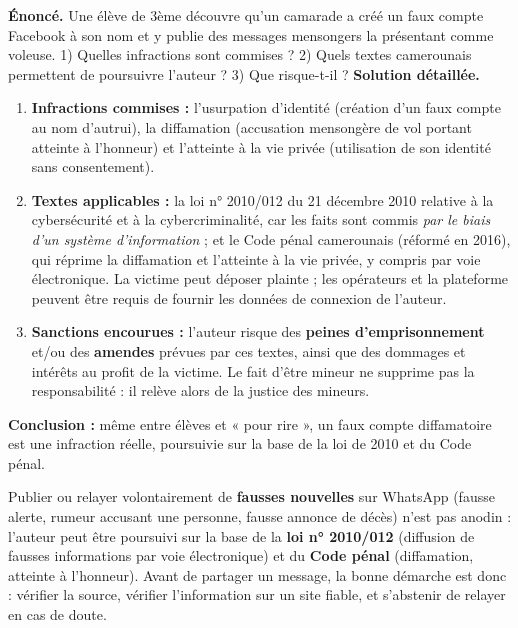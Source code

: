 \documentclass[11pt]{article}
\begin{document}
\begin{exoresolu}
\textbf{Énoncé.} Une élève de 3ème découvre qu'un camarade a créé un faux compte Facebook à son nom et y publie des messages mensongers la présentant comme voleuse. 1) Quelles infractions sont commises ? 2) Quels textes camerounais permettent de poursuivre l'auteur ? 3) Que risque-t-il ?
\tcblower
\textbf{Solution détaillée.}
\begin{enumerate}
\item \textbf{Infractions commises :} l'usurpation d'identité (création d'un faux compte au nom d'autrui), la diffamation (accusation mensongère de vol portant atteinte à l'honneur) et l'atteinte à la vie privée (utilisation de son identité sans consentement).
\item \textbf{Textes applicables :} la loi n° 2010/012 du 21 décembre 2010 relative à la cybersécurité et à la cybercriminalité, car les faits sont commis \emph{par le biais d'un système d'information} ; et le Code pénal camerounais (réformé en 2016), qui réprime la diffamation et l'atteinte à la vie privée, y compris par voie électronique. La victime peut déposer plainte ; les opérateurs et la plateforme peuvent être requis de fournir les données de connexion de l'auteur.
\item \textbf{Sanctions encourues :} l'auteur risque des \textbf{peines d'emprisonnement} et/ou des \textbf{amendes} prévues par ces textes, ainsi que des dommages et intérêts au profit de la victime. Le fait d'être mineur ne supprime pas la responsabilité : il relève alors de la justice des mineurs.
\end{enumerate}
\textbf{Conclusion :} même entre élèves et « pour rire », un faux compte diffamatoire est une infraction réelle, poursuivie sur la base de la loi de 2010 et du Code pénal.
\end{exoresolu}

\begin{exemplebox}
Publier ou relayer volontairement de \textbf{fausses nouvelles} sur WhatsApp (fausse alerte, rumeur accusant une personne, fausse annonce de décès) n'est pas anodin : l'auteur peut être poursuivi sur la base de la \textbf{loi n° 2010/012} (diffusion de fausses informations par voie électronique) et du \textbf{Code pénal} (diffamation, atteinte à l'honneur). Avant de partager un message, la bonne démarche est donc : vérifier la source, vérifier l'information sur un site fiable, et s'abstenir de relayer en cas de doute.
\end{exemplebox}
\end{document}

